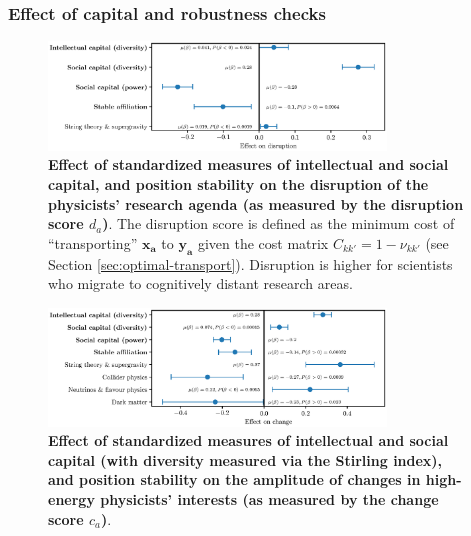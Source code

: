 \documentclass{article}
\begin{document}
\subsubsection{\label{appendix:robustness}Effect of capital and robustness checks}


\begin{figure}[H]
    \centering
    \includegraphics[width=0.8\textwidth]{plots/disruption_score_effects_entropy_magnitude.eps}
    \caption{\textbf{Effect of standardized measures of intellectual and social capital, and position stability on the disruption of the physicists' research agenda (as measured by the disruption score $d_a$)}. The disruption score is defined as the minimum cost of ``transporting'' $\bm{x_a}$ to $\bm{y_a}$ given the cost matrix $C_{kk'}=1-\nu_{kk'}$ (see Section \ref{sec:optimal-transport}). Disruption is higher for scientists who migrate to cognitively distant research areas.}
    \label{fig:disruption_score_effect}
\end{figure}


\begin{figure}[H]
    \centering
    \includegraphics[width=0.8\textwidth]{plots/change_score_effects_stirling_magnitude.eps}
    \caption{\textbf{Effect of standardized measures of intellectual and social capital (with diversity measured via the Stirling index), and position stability on the amplitude of changes in high-energy physicists' interests (as measured by the change score $c_a$)}. }
    \label{fig:change_score_effect_stirling}
\end{figure}
\end{document}
